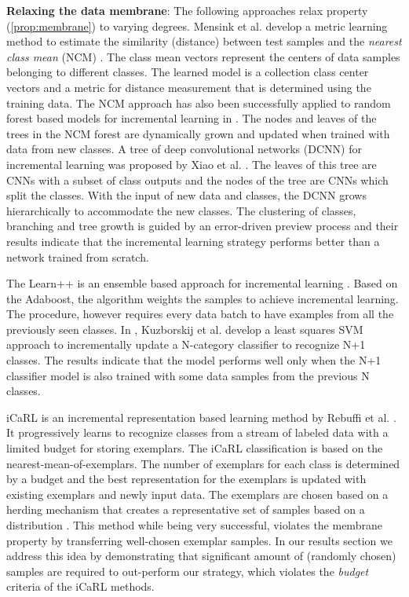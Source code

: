 \documentclass[10pt,twocolumn,letterpaper]{article}
\begin{document}
	\noindent\textbf{Relaxing the data membrane}:
	The following approaches relax property (\ref{prop:membrane}) to varying degrees. 
	Mensink et al. develop a metric learning method to estimate the similarity (distance) between test samples and the \emph{nearest class mean} (NCM) \cite{mensink2012metric, mensink2013distance}. 
	The class mean vectors represent the centers of data samples belonging to different classes. 
	The learned model is a collection class center vectors and a metric for distance measurement that is determined using the training data. 
	The NCM approach has also been successfully applied to random forest based models for incremental learning in \cite{ristin2014incremental}. 
	The nodes and leaves of the trees in the NCM forest are dynamically grown and updated when trained with data from new classes. 
	A tree of deep convolutional networks (DCNN) for incremental learning was proposed by Xiao et al. \cite{xiao2014error}. 
	The leaves of this tree are CNNs with a subset of class outputs and the nodes of the tree are CNNs which split the classes. 
	With the input of new data and classes, the DCNN grows hierarchically to accommodate the new classes. 
	The clustering of classes, branching and tree growth is guided by an error-driven preview process and their results indicate that the incremental learning strategy performs better than a network trained from scratch. 
	
	The Learn++ is an ensemble based approach for incremental learning \cite{polikar2001learn} \cite{muhlbaier2009learn}. 
	Based on the Adaboost, the algorithm weights the samples to achieve incremental learning. 
	The procedure, however requires every data batch to have examples from all the previously seen classes. 
	In \cite{kuzborskij2013n}, Kuzborskij et al. develop a least squares SVM approach to incrementally update a N-category classifier to recognize N+1 classes. 
	The results indicate that the model performs well only when the N+1 classifier model is also trained with some data samples from the previous N classes.
	
	iCaRL is an incremental representation based learning method by Rebuffi et al. \cite{rebuffi2016icarl}. 
	It progressively learns to recognize classes from a stream of labeled data with a limited budget for storing exemplars. 
	The iCaRL classification is based on the nearest-mean-of-exemplars. 
	The number of exemplars for each class is determined by a budget and the best representation for the exemplars is updated with existing exemplars and newly input data. 
	The exemplars are chosen based on a herding mechanism that creates a representative set of samples based on a distribution \cite{welling2009herding}. 
	This method while being very successful, violates the membrane property by transferring well-chosen exemplar samples.
	In our results section we address this idea by demonstrating that significant amount of (randomly chosen) samples are required to out-perform our strategy, which violates the \emph{budget} criteria of the iCaRL methods. 
	
\end{document}
